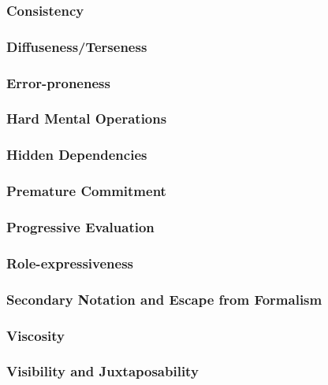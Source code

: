 \subsubsection{Consistency}


\subsubsection{Diffuseness/Terseness}


\subsubsection{Error-proneness}


\subsubsection{Hard Mental Operations}


\subsubsection{Hidden Dependencies}


\subsubsection{Premature Commitment}


\subsubsection{Progressive Evaluation}


\subsubsection{Role-expressiveness}


\subsubsection{Secondary Notation and Escape from Formalism}


\subsubsection{Viscosity}


\subsubsection{Visibility and Juxtaposability}
